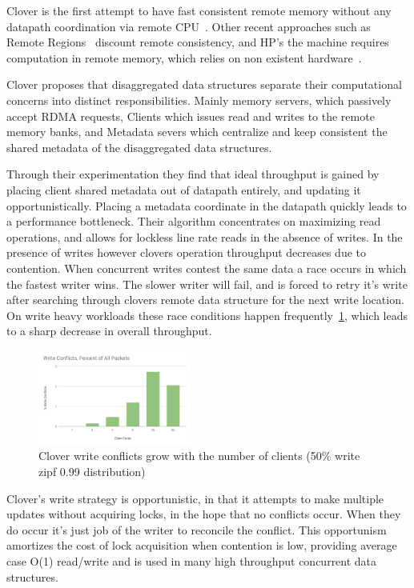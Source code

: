 Clover is the first attempt to have fast consistent remote memory
without any datapath coordination via remote CPU~\cite{clover}. Other
recent approaches such as Remote Regions~\cite{reigons} discount
remote consistency, and HP's the machine requires computation in
remote memory, which relies on non existent
hardware~\cite{aguilera2019designing}.

Clover proposes that disaggregated data structures separate their
computational concerns into distinct responsibilities. Mainly memory
servers, which passively accept RDMA requests, Clients which issues read and
writes to the remote memory banks, and Metadata severs which
centralize and keep consistent the shared metadata of the disaggregated
data structures.

Through their experimentation they find that ideal throughput is
gained by placing client shared metadata out of datapath entirely, and
updating it opportunistically. Placing a metadata coordinate in the
datapath quickly leads to a performance bottleneck. Their algorithm
concentrates on maximizing read operations, and allows for lockless
line rate reads in the absence of writes. In the presence of writes
however clovers operation throughput decreases due to contention. When
concurrent writes contest the same data a race occurs in which the
fastest writer wins. The slower writer will fail, and is forced to
retry it's write after searching through clovers remote data structure
for the next write location. On write heavy workloads these race
conditions happen frequently~\ref{fig:conflicts}, which leads to a
sharp decrease in overall throughput.

\begin{figure}
    \includegraphics[width=0.45\textwidth]{fig/write_conflicts.pdf}
    \caption{Clover write conflicts grow with the number of clients
    (50\% write zipf 0.99 distribution)}
    \label{fig:conflicts}
\end{figure}


Clover's write strategy is opportunistic, in that it attempts to make
multiple updates without acquiring locks, in the hope that no conflicts
occur. When they do occur it's just job of the writer to reconcile the
conflict. This opportunism amortizes the cost of lock acquisition when
contention is low, providing average case O(1) read/write and is used
in many high throughput concurrent data structures.

